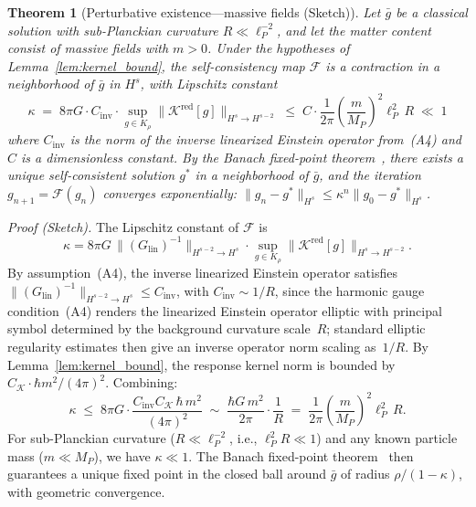 \documentclass[12pt,a4paper]{article}
\newtheorem{theorem}{Theorem}
\begin{document}
\medskip

\begin{theorem}[Perturbative existence---massive fields (Sketch)]
\label{thm:banach}
Let $\bar{g}$ be a classical solution with sub-Planckian curvature
$R \ll \ell_P^{-2}$, and let the matter content consist of massive fields with
$m > 0$. Under the hypotheses of Lemma~\ref{lem:kernel_bound}, the self-consistency
map $\mathcal{F}$ is a contraction in a neighborhood of $\bar{g}$ in $H^s$, with
Lipschitz constant
\begin{equation}
\kappa \;=\; 8\pi G \cdot C_{\mathrm{inv}} \cdot
\sup_{g \in K_\rho}\bigl\|\mathcal{K}^{\mathrm{red}}[g]\bigr\|_{H^s \to H^{s-2}}
\;\leq\; C \cdot \frac{1}{2\pi}\!\left(\frac{m}{M_P}\right)^{\!2}\ell_P^2\, R
\;\ll\; 1
\label{eq:kappa}
\end{equation}
where $C_{\mathrm{inv}}$ is the norm of the inverse linearized Einstein operator
from~\emph{(A4)} and $C$ is a dimensionless constant. By the Banach fixed-point
theorem~\cite{banach}, there exists a unique self-consistent solution $g^*$ in a neighborhood of
$\bar{g}$, and the iteration $g_{n+1} = \mathcal{F}(g_n)$ converges exponentially:
$\|g_n - g^*\|_{H^s} \leq \kappa^n\|g_0 - g^*\|_{H^s}$.
\end{theorem}

\noindent\emph{Proof (Sketch).} The Lipschitz constant of $\mathcal{F}$ is
\begin{equation}
\kappa = 8\pi G\,\bigl\|(G_{\mathrm{lin}})^{-1}\bigr\|_{H^{s-2}\to H^s}
\cdot \sup_{g \in K_\rho}
\bigl\|\mathcal{K}^{\mathrm{red}}[g]\bigr\|_{H^s \to H^{s-2}}.
\end{equation}
By assumption~(A4), the inverse linearized Einstein operator satisfies
$\|(G_{\mathrm{lin}})^{-1}\|_{H^{s-2}\to H^s} \leq C_{\mathrm{inv}}$, with
$C_{\mathrm{inv}} \sim 1/R$, since the harmonic gauge condition~(A4) renders the linearized Einstein operator elliptic with principal symbol determined by the background curvature scale~$R$; standard elliptic regularity estimates then give an inverse operator norm scaling as~$1/R$. By Lemma~\ref{lem:kernel_bound}, the response
kernel norm is bounded by $C_{\mathcal{K}} \cdot \hbar m^2/(4\pi)^2$. Combining:
\begin{equation}
\kappa \;\leq\; 8\pi G \cdot \frac{C_{\mathrm{inv}}C_{\mathcal{K}}\,\hbar\, m^2}{(4\pi)^2}
\;\sim\; \frac{\hbar G\, m^2}{2\pi}
\cdot \frac{1}{R}
\;=\; \frac{1}{2\pi}\!\left(\frac{m}{M_P}\right)^{\!2}\ell_P^2\, R.
\end{equation}
For sub-Planckian curvature ($R \ll \ell_P^{-2}$, i.e., $\ell_P^2 R \ll 1$)
and any known particle mass ($m \ll M_P$), we have $\kappa \ll 1$.
The Banach fixed-point theorem~\cite{banach} then guarantees a unique
fixed point in the closed ball around $\bar{g}$ of radius
$\rho/(1-\kappa)$, with geometric convergence.
\end{document}
